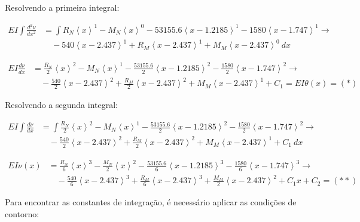 Resolvendo a primeira integral:

\begin{align*}
  EI \int \frac{d^2\nu}{dx^2} & = \int R_N \left<x\right>^1 - M_N \left<x\right>^0 -\num{53155.6} \left<x - \num{1.2185}\right>^1 - \num{1580} \left<x - \num{1.747}\right>^1 \rightarrow \\
                              & \quad - \num{540} \left<x - \num{2.437}\right>^1 + R_M \left<x - \num{2.437}\right>^1 + M_M \left<x - \num{2.437}\right>^0 \ dx
\end{align*}

\begin{align*}
  EI \frac{d\nu}{dx} & = \frac{R_N}{2} \left<x\right>^2 - M_N \left<x\right>^1 -\frac{\num{53155.6}}{2} \left<x - \num{1.2185}\right>^2 - \frac{\num{1580}}{2} \left<x - \num{1.747}\right>^2 \rightarrow     \\
                     & \quad - \frac{\num{540}}{2} \left<x - \num{2.437}\right>^2 + \frac{R_M}{2} \left<x - \num{2.437}\right>^2 + M_M \left<x - \num{2.437}\right>^1 + C_1 = EI \theta(x) = \left( * \right)
\end{align*}

Resolvendo a segunda integral:

\begin{align*}
  EI \int \frac{d\nu}{dx} & = \int \frac{R_N}{2} \left<x\right>^2 - M_N \left<x\right>^1 -\frac{\num{53155.6}}{2} \left<x - \num{1.2185}\right>^2 - \frac{\num{1580}}{2} \left<x - \num{1.747}\right>^2 \rightarrow \\
                          & \quad - \frac{\num{540}}{2} \left<x - \num{2.437}\right>^2 + \frac{R_M}{2} \left<x - \num{2.437}\right>^2 + M_M \left<x - \num{2.437}\right>^1 + C_1 \ dx
\end{align*}

\begin{align*}
  EI \nu(x) & = \frac{R_N}{6} \left<x\right>^3 - \frac{M_N}{2} \left<x\right>^2 -\frac{\num{53155.6}}{6} \left<x - \num{1.2185}\right>^3 - \frac{\num{1580}}{6} \left<x - \num{1.747}\right>^3 \rightarrow \\
            & \quad - \frac{\num{540}}{6} \left<x - \num{2.437}\right>^3 + \frac{R_M}{6} \left<x - \num{2.437}\right>^3 + \frac{M_M}{2} \left<x - \num{2.437}\right>^2 + C_1 x + C_2 = \left( ** \right)
\end{align*}

Para encontrar as constantes de integração, é necessário aplicar as condições de contorno:


